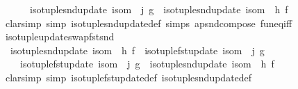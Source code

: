 \begin{isabellebody}
\ \ \ \ \ \ {\isacharparenleft}{\kern0pt}iso{\isacharunderscore}{\kern0pt}tuple{\isacharunderscore}{\kern0pt}snd{\isacharunderscore}{\kern0pt}update\ isom\ {\isasymcirc}\ j{\isacharparenright}{\kern0pt}\ g\ {\isasymcirc}\ {\isacharparenleft}{\kern0pt}iso{\isacharunderscore}{\kern0pt}tuple{\isacharunderscore}{\kern0pt}snd{\isacharunderscore}{\kern0pt}update\ isom\ {\isasymcirc}\ h{\isacharparenright}{\kern0pt}\ f{\isachardoublequoteclose}\isanewline
%
\isadelimproof
\ \ %
\endisadelimproof
%
\isatagproof
{}\isamarkupfalse%
\ {\isacharparenleft}{\kern0pt}clarsimp\ simp{\isacharcolon}{\kern0pt}\ iso{\isacharunderscore}{\kern0pt}tuple{\isacharunderscore}{\kern0pt}snd{\isacharunderscore}{\kern0pt}update{\isacharunderscore}{\kern0pt}def\ simps\ apsnd{\isacharunderscore}{\kern0pt}compose\ fun{\isacharunderscore}{\kern0pt}eq{\isacharunderscore}{\kern0pt}iff{\isacharparenright}{\kern0pt}%
\endisatagproof
{\isafoldproof}%
%
\isadelimproof
\isanewline
%
\endisadelimproof
\isanewline
{}\isamarkupfalse%
\ iso{\isacharunderscore}{\kern0pt}tuple{\isacharunderscore}{\kern0pt}update{\isacharunderscore}{\kern0pt}swap{\isacharunderscore}{\kern0pt}fst{\isacharunderscore}{\kern0pt}snd{\isacharcolon}{\kern0pt}\isanewline
\ \ {\isachardoublequoteopen}{\isacharparenleft}{\kern0pt}iso{\isacharunderscore}{\kern0pt}tuple{\isacharunderscore}{\kern0pt}snd{\isacharunderscore}{\kern0pt}update\ isom\ {\isasymcirc}\ h{\isacharparenright}{\kern0pt}\ f\ {\isasymcirc}\ {\isacharparenleft}{\kern0pt}iso{\isacharunderscore}{\kern0pt}tuple{\isacharunderscore}{\kern0pt}fst{\isacharunderscore}{\kern0pt}update\ isom\ {\isasymcirc}\ j{\isacharparenright}{\kern0pt}\ g\ {\isacharequal}{\kern0pt}\isanewline
\ \ \ \ {\isacharparenleft}{\kern0pt}iso{\isacharunderscore}{\kern0pt}tuple{\isacharunderscore}{\kern0pt}fst{\isacharunderscore}{\kern0pt}update\ isom\ {\isasymcirc}\ j{\isacharparenright}{\kern0pt}\ g\ {\isasymcirc}\ {\isacharparenleft}{\kern0pt}iso{\isacharunderscore}{\kern0pt}tuple{\isacharunderscore}{\kern0pt}snd{\isacharunderscore}{\kern0pt}update\ isom\ {\isasymcirc}\ h{\isacharparenright}{\kern0pt}\ f{\isachardoublequoteclose}\isanewline
%
\isadelimproof
\ \ %
\endisadelimproof
%
\isatagproof
{}\isamarkupfalse%
\ {\isacharparenleft}{\kern0pt}clarsimp\ simp{\isacharcolon}{\kern0pt}\ iso{\isacharunderscore}{\kern0pt}tuple{\isacharunderscore}{\kern0pt}fst{\isacharunderscore}{\kern0pt}update{\isacharunderscore}{\kern0pt}def\ iso{\isacharunderscore}{\kern0pt}tuple{\isacharunderscore}{\kern0pt}snd{\isacharunderscore}{\kern0pt}update{\isacharunderscore}{\kern0pt}def\isanewline

\end{isabellebody}
